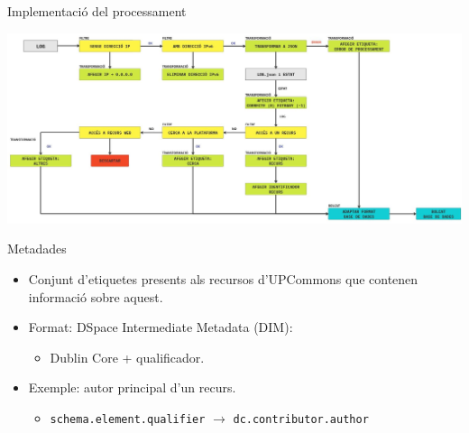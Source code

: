 \begin{frame}{Implementació del processament}
    \vfill
    \noindent
    \begin{adjustbox}{max size={1.175\textwidth}{\textheight},center}
        \includegraphics{figures/log-processing-workflow}
    \end{adjustbox}
    \vfill
\end{frame}


\begin{frame}{Metadades}
    \begin{itemize}%
        \item Conjunt d’etiquetes presents als recursos d’UPCommons que contenen informació sobre aquest.
        \item Format: DSpace Intermediate Metadata (DIM):
        \begin{itemize}%
            \item Dublin Core + qualificador.
        \end{itemize}
        \item Exemple: autor principal d'un recurs.
        \begin{itemize}%
            \item \texttt{schema.element.qualifier} \(\rightarrow\) \texttt{dc.contributor.author}
        \end{itemize}
    \end{itemize}
\end{frame}


